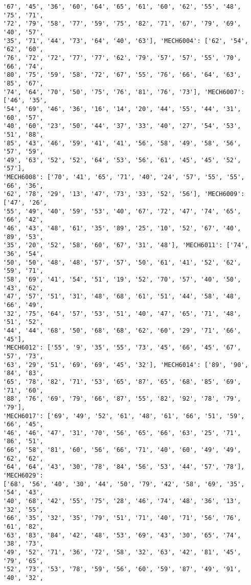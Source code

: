 \documentclass[11pt]{article}
\begin{document}
\begin{Verbatim}[commandchars=\\\{\}]
'67', '45', '36', '60', '64', '65', '61', '60', '62', '55', '48', '75', '71',
'72', '79', '58', '77', '59', '75', '82', '71', '67', '79', '69', '40', '57',
'35', '71', '44', '73', '64', '40', '63'], 'MECH6004': ['62', '54', '62', '60',
'76', '72', '72', '77', '77', '62', '79', '57', '57', '55', '70', '66', '74',
'80', '75', '59', '58', '72', '67', '55', '76', '66', '64', '63', '85', '67',
'74', '64', '70', '50', '75', '76', '81', '76', '73'], 'MECH6007': ['46', '35',
'54', '69', '46', '36', '16', '14', '20', '44', '55', '44', '31', '60', '57',
'40', '60', '23', '50', '44', '37', '33', '40', '27', '54', '53', '51', '88',
'85', '43', '46', '59', '41', '41', '56', '58', '49', '58', '56', '57', '59',
'49', '63', '52', '52', '64', '53', '56', '61', '45', '45', '52', '57'],
'MECH6008': ['70', '41', '65', '71', '40', '24', '57', '55', '55', '66', '36',
'62', '78', '29', '13', '47', '73', '33', '52', '56'], 'MECH6009': ['47', '26',
'55', '49', '40', '59', '53', '40', '67', '72', '47', '74', '65', '66', '42',
'46', '43', '48', '61', '35', '89', '25', '10', '52', '67', '40', '89', '53',
'35', '20', '52', '58', '60', '67', '31', '48'], 'MECH6011': ['74', '36', '54',
'50', '50', '48', '48', '57', '57', '50', '61', '41', '52', '62', '59', '71',
'58', '69', '41', '54', '51', '19', '52', '70', '57', '40', '50', '43', '62',
'47', '57', '51', '31', '48', '68', '61', '51', '44', '58', '48', '66', '49',
'32', '75', '64', '57', '53', '51', '40', '47', '65', '71', '48', '51', '52',
'44', '44', '68', '50', '68', '68', '62', '60', '29', '71', '66', '45'],
'MECH6012': ['55', '9', '35', '55', '73', '45', '66', '45', '67', '57', '73',
'63', '29', '51', '69', '69', '45', '32'], 'MECH6014': ['89', '90', '84', '83',
'65', '78', '82', '71', '53', '65', '87', '65', '68', '85', '69', '71', '60',
'88', '76', '69', '79', '66', '87', '55', '82', '92', '78', '79', '79'],
'MECH6017': ['69', '49', '52', '61', '48', '61', '66', '51', '59', '66', '45',
'46', '46', '47', '31', '70', '56', '65', '66', '63', '25', '71', '86', '51',
'66', '58', '81', '60', '56', '66', '71', '40', '60', '49', '49', '62', '62',
'64', '64', '43', '30', '78', '84', '56', '53', '44', '57', '78'], 'MECH6029':
['68', '56', '40', '30', '44', '50', '79', '42', '58', '69', '35', '54', '43',
'40', '68', '42', '55', '75', '28', '46', '74', '48', '36', '13', '32', '55',
'66', '35', '32', '35', '79', '51', '71', '40', '71', '56', '76', '61', '82',
'63', '83', '84', '42', '48', '53', '69', '43', '30', '65', '74', '38', '73',
'49', '52', '71', '36', '72', '58', '32', '63', '42', '81', '45', '79', '65',
'52', '73', '53', '78', '59', '56', '60', '59', '87', '49', '91', '40', '32',

\end{Verbatim}
\end{document}
